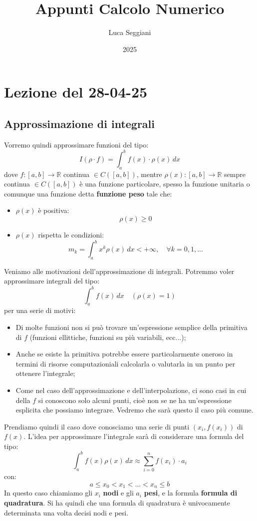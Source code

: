 \documentclass[a4paper,11pt]{article}
\title{Appunti Calcolo Numerico}
\author{Luca Seggiani}
\date{2025}
\begin{document}
\section{Lezione del 28-04-25}

\thispagestyle{empty}
\pagestyle{fancy}

\subsection{Approssimazione di integrali}
Vorremo quindi approssimare funzioni del tipo:
$$
I(\rho \cdot f) = \int_a^b f(x) \cdot \rho(x) \, dx
$$
dove $f: [a, b] \rightarrow \mathbb{R}$ continua $\in C\left([a, b]\right)$, mentre $\rho(x) : [a, b] \rightarrow \mathbb{R}$ sempre continua $\in C\left([a, b]\right)$ è una funzione particolare, spesso la funzione unitaria o comunque una funzione detta \textbf{funzione peso} tale che:
\begin{itemize}
	\item $\rho(x)$ è positiva:
		$$ \rho(x) \geq 0 $$
	\item $\rho(x)$ rispetta le condizioni:
		$$ m_k = \int_a^b x^k \rho(x) \, dx < +\infty, \quad \forall k = 0, 1, ... $$
\end{itemize}

Veniamo alle motivazioni dell'approssimazione di integrali. 
Potremmo voler approssimare integrali del tipo:
$$
\int_a^b f(x) \, dx \quad \left( \rho(x) = 1 \right)
$$
per una serie di motivi:
\begin{itemize}
	\item Di molte funzioni non si può trovare un'espressione semplice della primitiva di $f$ (funzioni ellittiche, funzioni su più variabili, ecc...);
	\item Anche se esiste la primitiva potrebbe essere particolarmente oneroso in termini di risorse computazioniali calcolarla o valutarla in un punto per ottenere l'integrale;
	\item Come nel caso dell'approssimazione e dell'interpolazione, ci sono casi in cui della $f$ si conoscono solo alcuni punti, cioè non se ne ha un'espressione esplicita che possiamo integrare. Vedremo che sarà questo il caso più comune.
\end{itemize}

Prendiamo quindi il caso dove conosciamo una serie di punti $(x_i, f(x_i))$ di $f(x)$.
L'idea per approssimare l'integrale sarà di considerare una formula del tipo:
$$
\int_a^b f(x) \rho(x) \, dx \approx \sum_{i = 0}^n f(x_i) \cdot a_i
$$
con:
$$
a \leq x_0 < x_1 < ... < x_n \leq b
$$
In questo caso chiamiamo gli $x_i$ \textbf{nodi} e gli $a_i$ \textbf{pesi}, e la formula \textbf{formula di quadratura}.
Si ha quindi che una formula di quadratura è univocamente determinata una volta decisi nodi e pesi.
\end{document}

